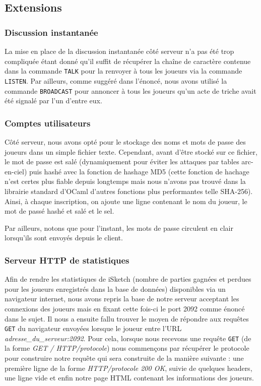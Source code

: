 \documentclass[a4paper, 11pt]{article}
\begin{document}
\subsection {Extensions}

\subsubsection{Discussion instantanée}

La mise en place de la discussion instantanée côté serveur n’a pas
été trop compliquée étant donné qu’il suffit de récupérer la chaîne de
caractère contenue dans la commande \verb+TALK+ pour la renvoyer à
tous les joueurs via la commande \verb+LISTEN+. Par ailleurs, comme
suggéré dans l’énoncé, nous avons utilisé la commande
\verb+BROADCAST+ pour annoncer à tous les joueurs qu’un acte de triche
avait été signalé par l’un d’entre eux.

\subsubsection {Comptes utilisateurs}

Côté serveur, nous avons opté pour le stockage des noms et mots de
passe des joueurs dans un simple fichier texte. Cependant, avant
d'être stocké sur ce fichier, le mot de passe est salé (dynamiquement
pour éviter les attaques par tables arc-en-ciel) puis hashé avec la
fonction de hashage MD5 (cette fonction de hachage n'est certes plus
fiable depuis longtemps mais nous n’avons pas trouvé dans la librairie
standard d'OCaml d’autres fonctions plus performantes telle SHA-256).
Ainsi, à chaque inscription, on ajoute une ligne contenant le nom du
joueur, le mot de passé hashé et salé et le sel.

\bigskip Par ailleurs, notons que pour l’instant, les mots de passe
circulent en clair lorsqu’ils sont envoyés depuis le client.

\subsubsection {Serveur HTTP de statistiques}

Afin de rendre les statistiques de iSketch (nombre de parties gagnées
et perdues pour les joueurs enregistrés dans la base de données)
disponibles via un navigateur internet, nous avons repris la base de
notre serveur acceptant les connexions des joueurs mais en fixant
cette fois-ci le port 2092 comme énoncé dans le sujet. Il nous a
ensuite fallu trouver le moyen de répondre aux requêtes \verb+GET+ du
navigateur envoyées lorsque le joueur entre l’URL
\textit{adresse\_du\_serveur:2092}. Pour cela, lorsque nous recevons
une requête \verb+GET+ (de la forme \textit{GET / HTTP/protocole})
nous commençons par récupérer le protocole pour construire notre
requête qui sera construite de la manière suivante : une première
ligne de la forme \textit{HTTP/protocole 200 OK}, suivie de quelques
headers, une ligne vide et enfin notre page HTML contenant les
informations des joueurs.
\end{document}
